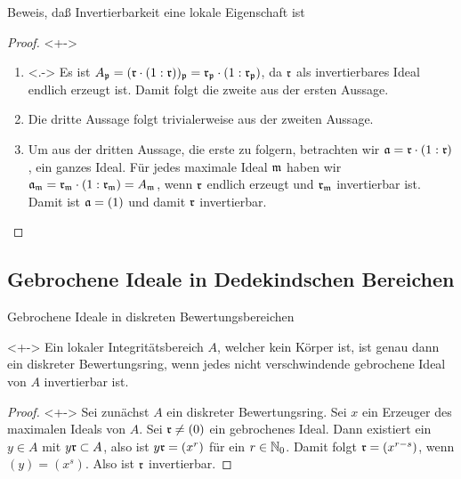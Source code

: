 \begin{frame}{Beweis, daß Invertierbarkeit eine lokale Eigenschaft ist}
	\begin{proof}<+->
		\begin{enumerate}[<+->]
			\item<.->
				Es ist \(A_{\mathfrak{p}} = (\mathfrak{r} \cdot (1 : \mathfrak{r}))_{\mathfrak{p}}
				= \mathfrak{r}_{\mathfrak{p}} \cdot (1 : \mathfrak{r}_{\mathfrak{p}})\), da
				\(\mathfrak{r}\) als invertierbares Ideal endlich erzeugt ist.
				Damit folgt die zweite aus der ersten Aussage.
			\item
				Die dritte Aussage folgt trivialerweise aus der zweiten Aussage.
			\item
				Um aus der dritten Aussage, die erste zu folgern, betrachten wir
				\(\mathfrak{a} = \mathfrak{r} \cdot (1 : \mathfrak{r})\), ein ganzes Ideal.
				Für jedes maximale Ideal \(\mathfrak{m}\) haben wir
				\(\mathfrak{a}_{\mathfrak{m}} = \mathfrak{r}_{\mathfrak{m}}
				\cdot (1 : \mathfrak{r}_{\mathfrak{m}}) = A_{\mathfrak{m}}\), wenn \(\mathfrak{r}\) endlich erzeugt
				und \(\mathfrak{r}_{\mathfrak{m}}\) invertierbar ist. Damit ist
				\(\mathfrak{a} = (1)\) und damit \(\mathfrak{r}\) invertierbar.
				\qedhere
		\end{enumerate}
	\end{proof}
\end{frame}

\subsection{Gebrochene Ideale in Dedekindschen Bereichen}

\begin{frame}{Gebrochene Ideale in diskreten Bewertungsbereichen}
	\begin{proposition}<+->
		Ein lokaler Integritätsbereich \(A\), welcher kein Körper ist,
		ist genau dann ein diskreter
		Bewertungsring, wenn jedes nicht verschwindende gebrochene Ideal
		von \(A\) invertierbar ist.
	\end{proposition}
	\begin{proof}<+->
		\renewcommand{\qedsymbol}{}
		Sei zunächst \(A\) ein diskreter Bewertungsring. Sei \(x\) ein
		Erzeuger des maximalen Ideals von \(A\). Sei \(\mathfrak{r} \neq (0)\)
		ein gebrochenes Ideal. Dann existiert ein \(y \in A\) mit
		\(y \mathfrak{r} \subset A\), also ist \(y \mathfrak{r} = (x^r)\) für ein
		\(r \in \mathbb N_0\). Damit folgt \(\mathfrak{r} = (x^{r - s})\), wenn
		\((y) = (x^s)\). Also ist \(\mathfrak{r}\) invertierbar.
	\end{proof}
\end{frame}


